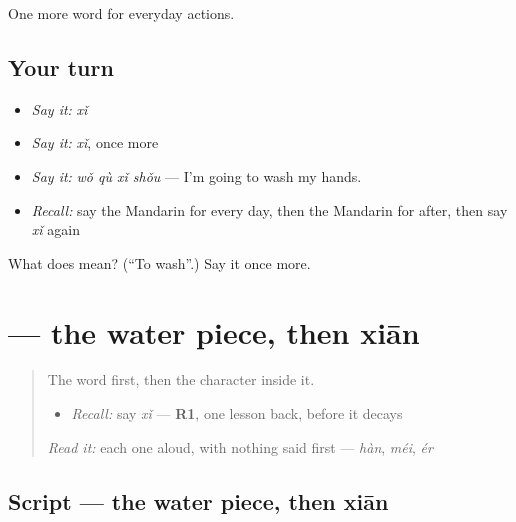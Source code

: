 \begin{grammarlens}[title={What you've built}]
One more word for everyday actions.
\end{grammarlens}

\subsection*{Your turn}
\begin{itemize}
\raggedright
  \item \emph{Say it:} \emph{xǐ}
  \item \emph{Say it:} \emph{xǐ}, once more
  \item \emph{Say it:} \emph{wǒ qù xǐ shǒu} — I'm going to wash my hands.
  \item \emph{Recall:} say the Mandarin for every day, then the Mandarin for after, then say \emph{xǐ} again
\end{itemize}

\begin{tcolorbox}[breakable,colback=teal!4,colframe=teal!35!black,title={Before you move on}]
What does  mean? (\textquotedblleft{}To wash\textquotedblright{}.) Say it once more.
\end{tcolorbox}
\section[\texorpdfstring{\zh{洗} (xǐ)}{洗 (xǐ)}]{ — the water piece, then xiān}

\label{lesson:ZH-W99-xi-wash}



\begin{quote}
The word first, then the character inside it.

\begin{itemize}
\raggedright
  \item \emph{Recall:} say \emph{xǐ} — \textbf{R1}, one lesson back, before it decays
\end{itemize}

\begin{quote}
  
\end{quote}

\emph{Read it:} each one aloud, with nothing said first — \emph{hàn}, \emph{méi}, \emph{ér}
\end{quote}

\subsection*{Script — the water piece, then xiān}

